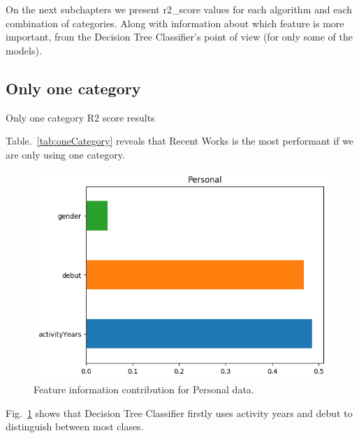 On the next subchapters we present r2\_score values for each algorithm and each combination of categories. Along with information about which feature is more important, from the Decision Tree Classifier's point of view (for only some of the models).

\FloatBarrier
\subsection{Only one category}
\begin{table}[!hbt]
	\begin{center}
	\caption{Only one category R2 score results}
	\label{tab:oneCategory}
	
	\end{center}
\end{table}

Table.~\ref{tab:oneCategory} reveals that Recent Works is the most performant if we are only using one category.

\begin{figure}[!hbt]
	\centering
	\includegraphics[width=\columnwidth]{graphics/Personal_DTC_featureImportances.png}
	\caption{Feature information contribution for Personal data.}
	\label{fig:DTC_P}
\end{figure}

Fig.~\ref{fig:DTC_P} shows that Decision Tree Classifier firstly uses activity years and debut to distinguish between most clases.

